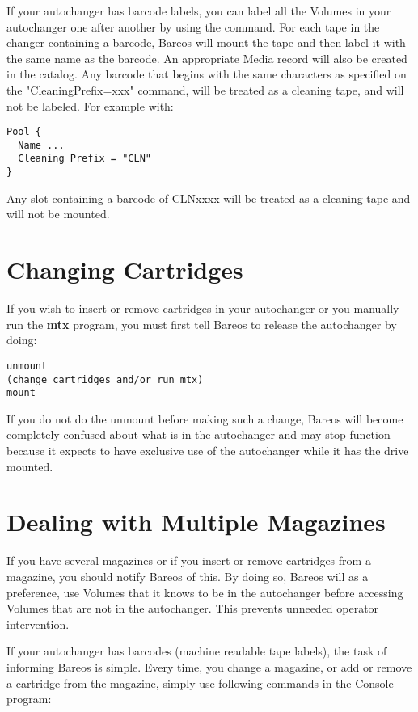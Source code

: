 If your autochanger has barcode labels, you can label all the Volumes in
your autochanger one after another by using the  command.
For each tape in the changer containing a barcode, Bareos will mount the tape
and then label it with the same name as the barcode. An appropriate Media
record will also be created in the catalog. Any barcode that begins with the
same characters as specified on the "CleaningPrefix=xxx" command, will be
treated as a cleaning tape, and will not be labeled.
For example with:

\footnotesize
\begin{verbatim}
Pool {
  Name ...
  Cleaning Prefix = "CLN"
}
\end{verbatim}
\normalsize

Any slot containing a barcode of CLNxxxx will be treated as a cleaning tape
and will not be mounted.


\section{Changing Cartridges}
If you wish to insert or remove cartridges in your autochanger or
you manually run the {\bf mtx} program, you must first tell Bareos
to release the autochanger by doing:

\footnotesize
\begin{verbatim}
unmount
(change cartridges and/or run mtx)
mount
\end{verbatim}
\normalsize

If you do not do the unmount before making such a change, Bareos
will become completely confused about what is in the autochanger
and may stop function because it expects to have exclusive use
of the autochanger while it has the drive mounted.


\section{Dealing with Multiple Magazines}

If you have several magazines or if you insert or remove cartridges from a
magazine, you should notify Bareos of this. By doing so, Bareos will as
a preference, use Volumes that it knows to be in the autochanger before
accessing Volumes that are not in the autochanger. This prevents unneeded
operator intervention.

If your autochanger has barcodes (machine readable tape labels), the task of
informing Bareos is simple. Every time, you change a magazine, or add or
remove a cartridge from the magazine, simply use following commands in the Console program:

